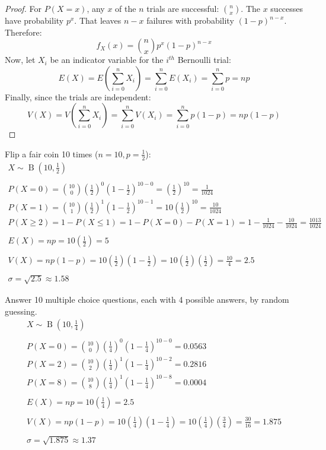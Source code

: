 \documentclass[letterpaper,12pt,fleqn]{article}
\DeclareMathOperator{\bin}{B}
\renewcommand{\o}{\sigma}
\begin{document}
\begin{proof}
  For \(P(X=x)\), any \(x\) of the \(n\) trials are successful: \(\binom{n}{x}\).  The \(x\) successes have probability
  \(p^x\).  That leaves \(n-x\) failures with probability \((1-p)^{n-x}\).  Therefore:
  \[f_X(x)=\binom{n}{x}p^x(1-p)^{n-x}\]
  Now, let \(X_i\) be an indicator variable for the \(i^{th}\) Bernoulli trial:
  \[E(X)=E\left(\sum_{i=0}^nX_i\right)=\sum_{i=0}^nE(X_i)=\sum_{i=0}^np=np\]
  Finally, since the trials are independent:
  \[V(X)=V\left(\sum_{i=0}^nX_i\right)=\sum_{i=0}^nV(X_i)=\sum_{i=0}^np(1-p)=np(1-p)\]
\end{proof}

\begin{example}
  Flip a fair coin 10 times (\(n=10, p=\frac{1}{2}\)):
  \begin{gather*}
    X\sim\bin\left(10,\frac{1}{2}\right) \\
    \\
    P(X=0)=\binom{10}{0}\left(\frac{1}{2}\right)^0\left(1-\frac{1}{2}\right)^{10-0}=\left(\frac{1}{2}\right)^{10}=
    \frac{1}{1024} \\
    P(X=1)=\binom{10}{1}\left(\frac{1}{2}\right)^1\left(1-\frac{1}{2}\right)^{10-1}=10\left(\frac{1}{2}\right)^{10}=
    \frac{10}{1024} \\
    P(X\ge2)=1-P(X\le1)=1-P(X=0)-P(X=1)=1-\frac{1}{1024}-\frac{10}{1024}=\frac{1013}{1024} \\
    \\
    E(X)=np=10\left(\frac{1}{2}\right)=5 \\
    \\
    V(X)=np(1-p)=10\left(\frac{1}{2}\right)\left(1-\frac{1}{2}\right)=10\left(\frac{1}{2}\right)\left(\frac{1}{2}\right)=
    \frac{10}{4}=2.5 \\
    \\
    \o=\sqrt{2.5}\approx1.58
  \end{gather*}
\end{example}

\begin{example}
Answer 10 multiple choice questions, each with 4 possible answers, by random guessing.
  \begin{gather*}
    X\sim\bin\left(10,\frac{1}{4}\right) \\
    \\
    P(X=0)=\binom{10}{0}\left(\frac{1}{4}\right)^0\left(1-\frac{1}{4}\right)^{10-0}=0.0563 \\
    P(X=2)=\binom{10}{2}\left(\frac{1}{4}\right)^1\left(1-\frac{1}{4}\right)^{10-2}=0.2816 \\
    P(X=8)=\binom{10}{8}\left(\frac{1}{4}\right)^1\left(1-\frac{1}{4}\right)^{10-8}=0.0004 \\
    \\
    E(X)=np=10\left(\frac{1}{4}\right)=2.5 \\
    \\
    V(X)=np(1-p)=10\left(\frac{1}{4}\right)\left(1-\frac{1}{4}\right)=10\left(\frac{1}{4}\right)\left(\frac{3}{4}\right)=
    \frac{30}{16}=1.875 \\
    \\
    \o=\sqrt{1.875}\approx1.37
  \end{gather*}
\end{example}
\end{document}
